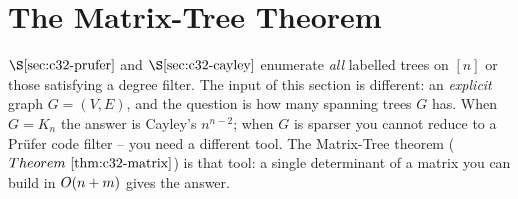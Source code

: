 \section{The Matrix-Tree Theorem}\label{sec:c32-matrix}

\begin{previouslybox}
\(\secref{c32-prufer}\) and \(\secref{c32-cayley}\) enumerate \emph{all}
labelled trees on \([n]\) or those satisfying a degree filter.  The input of
this section is different: an \emph{explicit} graph \(G=(V,E)\), and the
question is how many spanning trees \(G\) has.  When \(G=K_n\) the answer is
Cayley's \(n^{n-2}\); when \(G\) is sparser you cannot reduce to a Pr\"ufer
code filter -- you need a different tool.  The Matrix-Tree theorem
(\(\thmref{c32-matrix}\)) is that tool: a single determinant of a matrix you
can build in \(O(n+m)\) gives the answer.
\end{previouslybox}


